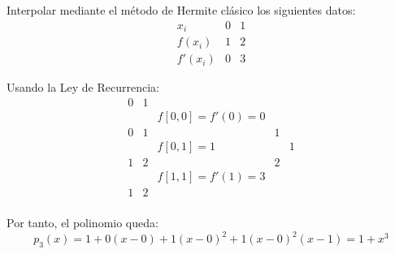 \begin{ejemplo}
    Interpolar mediante el método de Hermite clásico los siguientes datos:
    \begin{equation*}
        \begin{array}{c|cc}
            x_i & 0 & 1 \\ \hline
            f(x_i) & 1 & 2 \\ \hline
            f'(x_i) & 0 & 3
        \end{array}
    \end{equation*}

    Usando la Ley de Recurrencia:
    \begin{equation*}
        \begin{array}{c|ccccc}
            0 & 1 \\
            && f[0,0]=f'(0)=0 \\ 
            0 & 1 && 1\\
            && f[0,1]=1 & & 1\\
            1 & 2 & & 2 \\
            && f[1,1]=f'(1)=3\\
            1 & 2 \\
        \end{array}
    \end{equation*}

    Por tanto, el polinomio queda:
    \begin{equation*}
        p_3(x) = 1+0(x-0) +1(x-0)^2 +1(x-0)^2(x-1) = 1+x^3
    \end{equation*}
\end{ejemplo}


